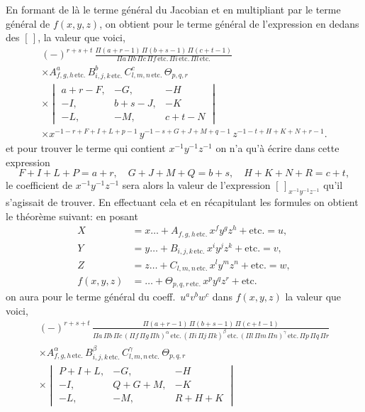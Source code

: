 \documentclass[11pt,a4paper]{book}
\theoremstyle{plain}
\begin{document}
En formant de l\`{a} le terme g\'{e}n\'{e}ral du Jacobian et en multipliant par le terme g\'{e}n\'{e}ral de $f(x,y,z)$, on obtient pour le terme g\'{e}n\'{e}ral de l'expression en dedans des $[\,]$, la valeur que voici,
\begin{multline*}
(-)^{r+s+t}\,\frac{\Pi(a+r-1)\,\Pi(b+s-1)\,\Pi(c+t-1)}{\Pi a\,\Pi b\,\Pi c\,\Pi f\,\text{etc.}\,\Pi i\,\text{etc.}\,\Pi l\,\text{etc.}}\\
\times A^a_{f,g,h\,\text{etc.}}\,B^b_{i,j,k\,\text{etc.}}\,C^c_{l,m,n\,\text{etc.}}\,\Theta_{p,q,r}\\
\times \begin{vmatrix}
a+r-F, & -G, & -H\\
-I, & b+s-J, & -K\\
-L, & -M, & c+t-N
\end{vmatrix}\\
\times x^{-1-r+F+I+L+p-1}\,y^{-1-s+G+J+M+q-1}\,z^{-1-t+H+K+N+r-1}.
\end{multline*}
et pour trouver le terme qui contient $x^{-1}y^{-1}z^{-1}$ on n'a qu'\`{a} \'{e}crire dans cette expression
\[
F+I+L+P=a+r,\quad G+J+M+Q=b+s,\quad H+K+N+R=c+t,
\]
le coefficient de $x^{-1}y^{-1}z^{-1}$ sera alors la valeur de l'expression $[\,]_{x^{-1}y^{-1}z^{-1}}$ qu'il s'agissait de trouver. En effectuant cela et en r\'{e}capitulant les formules on obtient le th\'{e}or\`{e}me suivant: en posant
\begin{align*}
X &= x\ldots+A_{f,g,h\,\text{etc.}}\,x^f y^g z^h+\text{etc.}=u,\\
Y &= y\ldots+B_{i,j,k\,\text{etc.}}\,x^i y^j z^k+\text{etc.}=v,\\
Z &= z\ldots+C_{l,m,n\,\text{etc.}}\,x^l y^m z^n+\text{etc.}=w,\\
f(x,y,z) &= \ldots+\Theta_{p,q,r\,\text{etc.}}\,x^p y^q z^r+\text{etc.}
\end{align*}
on aura pour le terme g\'{e}n\'{e}ral du coeff.\ $u^a v^b w^c$ dans $f(x,y,z)$ la valeur que voici,
\begin{multline*}
(-)^{r+s+t}\,\frac{\Pi(a+r-1)\,\Pi(b+s-1)\,\Pi(c+t-1)}{\Pi a\,\Pi b\,\Pi c\,(\Pi f\,\Pi g\,\Pi h)^{\alpha}\,\text{etc.}\,(\Pi i\,\Pi j\,\Pi k)^{\beta}\,\text{etc.}\,(\Pi l\,\Pi m\,\Pi n)^{\gamma}\,\text{etc.}\,\Pi p\,\Pi q\,\Pi r}\\
\times A^{\alpha}_{f,g,h\,\text{etc.}}\,B^{\beta}_{i,j,k\,\text{etc.}}\,C^{\gamma}_{l,m,n\,\text{etc.}}\,\Theta_{p,q,r}\\
\times \begin{vmatrix}
P+I+L, & -G, & -H\\
-I, & Q+G+M, & -K\\
-L, & -M, & R+H+K
\end{vmatrix}
\end{multline*}
\end{document}
